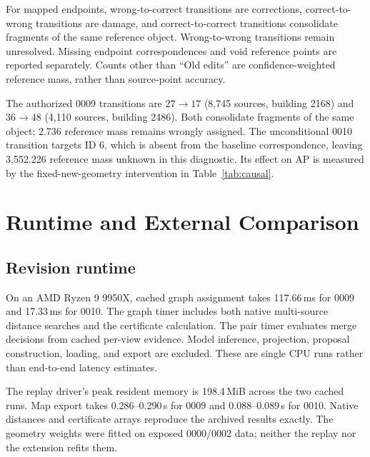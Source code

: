 For mapped endpoints, wrong-to-correct transitions are corrections, correct-to-wrong transitions are damage, and correct-to-correct transitions consolidate fragments of the same reference object. Wrong-to-wrong transitions remain unresolved. Missing endpoint correspondences and void reference points are reported separately. Counts other than ``Old edits'' are confidence-weighted reference mass, rather than source-point accuracy.

\begin{center}\footnotesize

\end{center}

The authorized 0009 transitions are $27\!\to\!17$ (8,745 sources, building 2168) and $36\!\to\!48$ (4,110 sources, building 2486). Both consolidate fragments of the same object; 2.736 reference mass remains wrongly assigned. The unconditional 0010 transition targets ID 6, which is absent from the baseline correspondence, leaving 3,552.226 reference mass unknown in this diagnostic. Its effect on AP is measured by the fixed-new-geometry intervention in Table~\ref{tab:causal}.

\section{Runtime and External Comparison}\label{app:runtime}
\subsection{Revision runtime}
On an AMD Ryzen 9 9950X, cached graph assignment takes 117.66\,ms for 0009 and 17.33\,ms for 0010. The graph timer includes both native multi-source distance searches and the certificate calculation. The pair timer evaluates merge decisions from cached per-view evidence. Model inference, projection, proposal construction, loading, and export are excluded. These are single CPU runs rather than end-to-end latency estimates.

\begin{center}\small

\end{center}

The replay driver's peak resident memory is 198.4\,MiB across the two cached runs. Map export takes 0.286--0.290\,s for 0009 and 0.088--0.089\,s for 0010. Native distances and certificate arrays reproduce the archived results exactly. The geometry weights were fitted on exposed 0000/0002 data; neither the replay nor the extension refits them.

